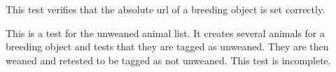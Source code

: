 \documentclass[letterpaper,10pt,english]{sphinxmanual}
\begin{document}
\begin{fulllineitems}

\begin{fulllineitems}
\label{api:animal.tests.BreedingModelTests.test_study_absolute_url}
This test verifies that the absolute url of a breeding object is set correctly.


\end{fulllineitems}


\begin{fulllineitems}
\label{api:animal.tests.BreedingModelTests.test_unweaned}
This is a test for the unweaned animal list.  It creates several animals for a breeding object and tests that they are tagged as unweaned.  They are then weaned and retested to be tagged as not unweaned.  This test is incomplete.


\end{fulllineitems}


\end{fulllineitems}

\end{document}
